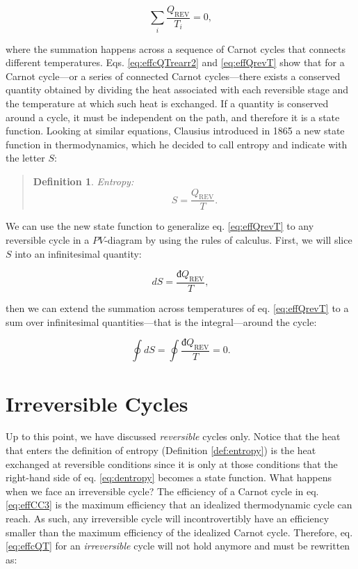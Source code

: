 \documentclass[
  9pt,
]{extbook}
\theoremstyle{definition}
\newtheorem{definition}{Definition}[chapter]
\theoremstyle{definition}
\theoremstyle{definition}
\theoremstyle{remark}
\begin{document}
\begin{equation}
\sum_i \frac{Q_{\mathrm{REV}}}{T_i} = 0,
\label{eq:effQrevT}
\end{equation}

where the summation happens across a sequence of Carnot cycles that connects different temperatures. Eqs. \eqref{eq:effcQTrearr2} and \eqref{eq:effQrevT} show that for a Carnot cycle---or a series of connected Carnot cycles---there exists a conserved quantity obtained by dividing the heat associated with each reversible stage and the temperature at which such heat is exchanged. If a quantity is conserved around a cycle, it must be independent on the path, and therefore it is a state function. Looking at similar equations, Clausius introduced in 1865 a new state function in thermodynamics, which he decided to call entropy and indicate with the letter \(S\):

\begin{quote}
\begin{definition}
\protect\hypertarget{def:entropy}{}{\label{def:entropy} }\emph{Entropy:} \begin{equation}
S = \frac{Q_{\mathrm{REV}}}{T}.
\end{equation}
\end{definition}
\end{quote}

We can use the new state function to generalize eq. \eqref{eq:effQrevT} to any reversible cycle in a \(PV\)-diagram by using the rules of calculus. First, we will slice \(S\) into an infinitesimal quantity:

\begin{equation}
dS = \frac{đQ_{\mathrm{REV}}}{T},
\label{eq:dentropy}
\end{equation}

then we can extend the summation across temperatures of eq. \eqref{eq:effQrevT} to a sum over infinitesimal quantities---that is the integral---around the cycle:

\begin{equation}
\oint dS = \oint \frac{đQ_{\mathrm{REV}}}{T} = 0.
\label{eq:ds0}
\end{equation}

\hypertarget{irreversible-cycles}{%
\section{Irreversible Cycles}\label{irreversible-cycles}}

Up to this point, we have discussed \emph{reversible} cycles only. Notice that the heat that enters the definition of entropy (Definition \ref{def:entropy}) is the heat exchanged at reversible conditions since it is only at those conditions that the right-hand side of eq. \eqref{eq:dentropy} becomes a state function. What happens when we face an irreversible cycle? The efficiency of a Carnot cycle in eq. \eqref{eq:effCC3} is the maximum efficiency that an idealized thermodynamic cycle can reach. As such, any irreversible cycle will incontrovertibly have an efficiency smaller than the maximum efficiency of the idealized Carnot cycle. Therefore, eq. \eqref{eq:effcQT} for an \emph{irreversible} cycle will not hold anymore and must be rewritten as:
\end{document}
